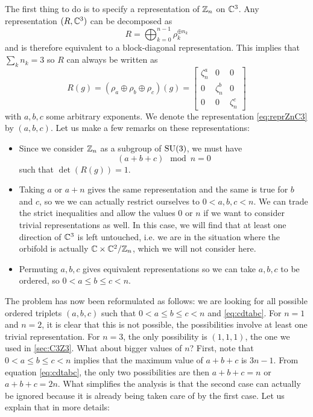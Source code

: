             The first thing to do is to specify a representation of $\mathbb{Z}_n$ on $\mathbb{C}^3$. Any representation $(R,\mathbb{C}^3)$ can be decomposed as
            \begin{equation}
                R=\bigoplus^{n-1}_{k=0} \rho^{\oplus n_k}_k
            \end{equation}
            and is therefore equivalent to a block-diagonal representation. This implies that $\sum_kn_k=3$ so $R$ can always be written as
            \begin{equation}
                R(g)= (\rho_a\oplus\rho_b\oplus\rho_c)(g)=
                \begin{bmatrix}
                    \zeta^a_n & 0 & 0 \\
                    0 & \zeta^b_n & 0 \\
                    0 & 0 & \zeta^c_n
                \end{bmatrix}\label{eq:reprZnC3}
            \end{equation}
            with $a,b,c$ some arbitrary exponents. We denote the representation \eqref{eq:reprZnC3} by $(a,b,c)$. Let us make a few remarks on these representations:
            \begin{itemize}
                \item Since we consider $\mathbb{Z}_n$ as a subgroup of $\text{SU}(3)$, we must have
                \begin{equation}
                    (a+b+c)\mod n = 0\label{eq:cdtabc}
                \end{equation}
                such that $\det(R(g))=1$.
                \item Taking $a$ or $a+n$ gives the same representation and the same is true for $b$ and $c$, so we we can actually restrict ourselves to $0<a,b,c<n$. We can trade the strict inequalities and allow the values $0$ or $n$ if we want to consider trivial representations as well. In this case, we will find that at least one direction of $\mathbb{C}^3$ is left untouched, i.e. we are in the situation where the orbifold is actually $\mathbb{C}\times\mathbb{C}^2/\mathbb{Z}_n$, which we will not consider here.
                \item Permuting $a,b,c$ gives equivalent representations so we can take $a,b,c$ to be ordered, so $0<a\leq b\leq c<n$.
            \end{itemize}

            The problem has now been reformulated as follows:
            we are looking for all possible ordered triplets $(a,b,c)$ such that $0<a\leq b\leq c<n$ and \eqref{eq:cdtabc}. For $n=1$ and $n=2$, it is clear that this is not possible, the possibilities involve at least one trivial representation. For $n=3$, the only possibility is $(1,1,1)$, the one we used in \ref{sec:C3Z3}. What about bigger values of $n$? First, note that $0<a\leq b\leq c<n$ implies that the maximum value of $a+b+c$ is $3n-1$. From equation \eqref{eq:cdtabc}, the only two possibilities are then $a+b+c=n$ or $a+b+c=2n$. What simplifies the analysis is that the second case can actually be ignored because it is already being taken care of by the first case. Let us explain that in more details: \marker
            
